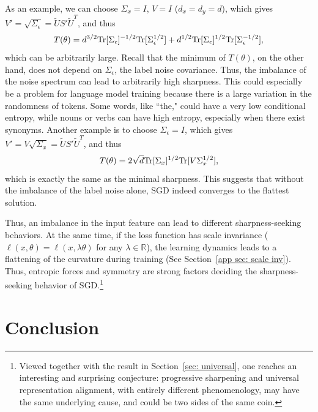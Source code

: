 \documentclass{article}
\theoremstyle{plain}
\newcommand{\Tr}{{\rm Tr}}
\begin{document}
As an example, we can choose $\Sigma_x=I$, $V=I$ ($d_x=d_y=d$), which gives $V'=\sqrt{\Sigma_\epsilon}=\tilde{U}S'\tilde{U}^T$, and thus
\begin{equation}
T(\theta)=d^{3/2}\Tr[\Sigma_\epsilon]^{-1/2}\Tr[\Sigma_\epsilon^{1/2}]+d^{1/2}\Tr[\Sigma_\epsilon]^{1/2}\Tr[\Sigma_\epsilon^{-1/2}],
\end{equation}
which can be arbitrarily large. Recall that the minimum of $T(\theta)$, on the other hand, does not depend on $\Sigma_\epsilon$, the label noise covariance. Thus, the imbalance of the noise spectrum can lead to arbitrarily high sharpness. This could especially be a problem for language model training because there is a large variation in the randomness of tokens. Some words, like ``the," could have a very low conditional entropy, while nouns or verbs can have high entropy, especially when there exist synonyms. Another example is to choose $\Sigma_\epsilon=I$, which gives $V'=V\sqrt{\Sigma_x}=\tilde{U}S'\tilde{U}^T$, and thus
\begin{equation}
T(\theta)=2\sqrt{d}\Tr[\Sigma_x]^{1/2}\Tr[V\Sigma_x^{1/2}],
\end{equation}
which is exactly the same as the minimal sharpness. This suggests that without the imbalance of the label noise alone, SGD indeed converges to the flattest solution.

Thus, an imbalance in the input feature can lead to different sharpness-seeking behaviors. At the same time, if the loss function has scale invariance ($\ell(x,\theta)=\ell(x, \lambda\theta)$ for any $\lambda\in\mathbb{R}$), the learning dynamics leads to a flattening of the curvature during training (See Section~\ref{app sec: scale inv}). Thus, entropic forces and symmetry are strong factors deciding the sharpness-seeking behavior of SGD.\footnote{Viewed together with the result in Section~\ref{sec: universal}, one reaches an interesting and surprising conjecture: progressive sharpening and universal representation alignment, with entirely different phenomenology,  may have the same underlying cause, and could be two sides of the same coin.}









\vspace{-1mm}
\section{Conclusion}
\vspace{-1mm}
\end{document}
